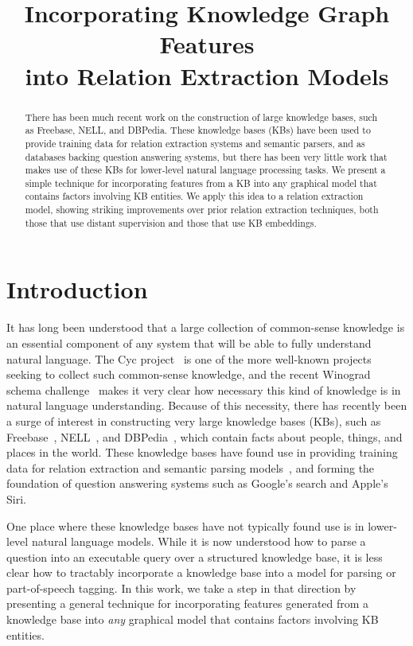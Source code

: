 \documentclass[11pt,a4paper]{article}
\title{Incorporating Knowledge Graph Features\\
into Relation Extraction Models}
\date{}
\begin{document}
\maketitle
\begin{abstract}

  There has been much recent work on the construction of large knowledge bases,
  such as Freebase, NELL, and DBPedia.  These knowledge bases (KBs) have been
  used to provide training data for relation extraction systems and semantic
  parsers, and as databases backing question answering systems, but there has
  been very little work that makes use of these KBs for lower-level natural
  language processing tasks.  We present a simple technique for incorporating
  features from a KB into any graphical model that contains factors involving
  KB entities.  We apply this idea to a relation extraction model, showing
  striking improvements over prior relation extraction techniques, both those
  that use distant supervision and those that use KB embeddings.

\end{abstract}

\section{Introduction}

It has long been understood that a large collection of common-sense knowledge
is an essential component of any system that will be able to fully understand
natural language.  The Cyc project~\cite{cyc-1995} is one of the more
well-known projects seeking to collect such common-sense knowledge, and the
recent Winograd schema challenge~\cite{winograd-schema-2012} makes it very
clear how necessary this kind of knowledge is in natural language
understanding.  Because of this necessity, there has recently been a surge of
interest in constructing very large knowledge bases (KBs), such as
Freebase~\cite{freebase-2008-bollacker}, NELL~\cite{nell-2015-aaai}, and
DBPedia~\cite{dbpedia-2012-mendes}, which contain facts about people, things,
and places in the world.  These knowledge bases have found use in providing
training data for relation extraction and semantic parsing
models~\cite{riedel-2010-distant-supervision,krishnamurthy-2012-semantic-parsing},
and forming the foundation of question answering systems such as Google's
search and Apple's Siri.

One place where these knowledge bases have not typically found use is in
lower-level natural language models.  While it is now understood how to parse a
question into an executable query over a structured knowledge base, it is less
clear how to tractably incorporate a knowledge base into a model for parsing or
part-of-speech tagging.  In this work, we take a step in that direction by
presenting a general technique for incorporating features generated from a
knowledge base into \emph{any} graphical model that contains factors involving
KB entities.
\end{document}
